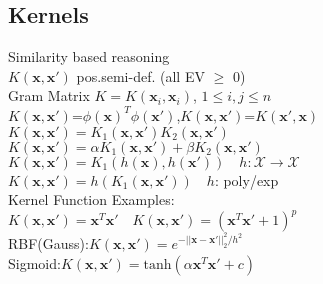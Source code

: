 \subsection*{Kernels}
Similarity based reasoning \\
$K(\mathbf{x},\mathbf{x'})$ pos.semi-def. (all EV $\geq$ 0)\\
Gram Matrix $K{=}K(\mathbf{x}_i, \mathbf{x}_i)$, $1{\leq} i,j{\leq} n$\\
$K(\mathbf{x}, \mathbf{x'}) \text{=} \phi(\mathbf{x})^T\phi(\mathbf{x'})$,$K(\mathbf{x},\mathbf{x'})\text{=}K(\mathbf{x'},\mathbf{x})$\\
\sepline
$K(\mathbf{x}, \mathbf{x'})=K_1(\mathbf{x}, \mathbf{x'})K_2(\mathbf{x}, \mathbf{x'})$\\
$K(\mathbf{x},\mathbf{x'})=\alpha K_1(\mathbf{x}, \mathbf{x'})+\beta K_2(\mathbf{x}, \mathbf{x'})$\\
$K(\mathbf{x},\mathbf{x'}){=}K_1(h(\mathbf{x}), h(\mathbf{x'}))\quad h:\mathcal{X}{\rightarrow}\mathcal{X}$\\
$K(\mathbf{x},\mathbf{x'}){=}h(K_1(\mathbf{x}, \mathbf{x'}))\quad h$: poly/exp\\
Kernel Function Examples:\\
$K(\mathbf{x},\mathbf{x'}){=}\mathbf{x}^T\mathbf{x'}\quad K(\mathbf{x},\mathbf{x'}){=}(\mathbf{x}^T\mathbf{x'}{+}1)^p$\\
RBF(Gauss):$K(\mathbf{x},\mathbf{x'}){=}e^{-||\mathbf{x}{-}\mathbf{x'}||_2^2/h^2}$\\
Sigmoid:$K(\mathbf{x},\mathbf{x'}){=}\mathrm{tanh}(\alpha\mathbf{x}^T\mathbf{x'}+c)$\\

